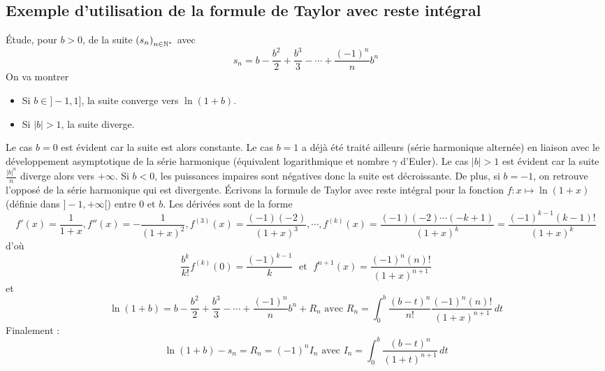 \subsection{Exemple d'utilisation de la formule de Taylor avec reste intégral}
\'Etude, pour $b>0$, de la suite $\left( s_n\right)_{n\in \mathbb{N}^*}$ avec
\begin{displaymath}
  s_n = b - \frac{b^2}{2} + \frac{b^3}{3}- \cdots + \frac{(-1)^n}{n}b^n
\end{displaymath}
On va montrer
\begin{itemize}
  \item Si $b\in ]-1,1]$, la suite converge vers $\ln(1+b)$.
  \item Si $|b|>1$, la suite diverge.
\end{itemize}
Le cas $b=0$ est évident car la suite est alors constante.
Le cas $b=1$ a déjà été traité ailleurs (série harmonique alternée) en liaison avec le développement asymptotique de la série harmonique (équivalent logarithmique et nombre $\gamma$ d'Euler).\newline
Le cas $|b|>1$ est évident car la suite $\frac{|b|^n}{n}$ diverge alors vers $+\infty$.\newline
Si $b<0$, les puissances impaires sont négatives donc la suite est décroissante. De plus, si $b=-1$, on retrouve l'opposé de la série harmonique qui est divergente.\newline
\'Ecrivons la formule de Taylor avec reste intégral pour la fonction $f : x\mapsto \ln(1+x)$ (définie dans $]-1,+\infty[$) entre $0$ et $b$.\newline
Les dérivées sont de la forme
\begin{displaymath}
f'(x) = \frac{1}{1+x}, f''(x) = -\frac{1}{(1+x)^2}, f^{(3)}(x) = \frac{(-1)(-2)}{(1+x)^3},\cdots,
f^{(k)}(x) = \frac{(-1)(-2)\cdots(-k+1)}{(1+x)^k}=\frac{(-1)^{k-1}(k-1)!}{(1+x)^k}
\end{displaymath}
d'où 
\begin{displaymath}
  \frac{b^k}{k!}f^{(k)}(0) = \frac{(-1)^{k-1}}{k} \;\text{ et }\;
  f^{n+1}(x) = \frac{(-1)^{n}(n)!}{(1+x)^{n+1}}
\end{displaymath}
et
\begin{displaymath}
\ln(1+b) = b - \frac{b^2}{2} + \frac{b^3}{3}- \cdots + \frac{(-1)^n}{n}b^n + R_n
\text{ avec }
R_n = \int_0^b\frac{(b-t)^n}{n!} \frac{(-1)^{n}(n)!}{(1+x)^{n+1}}\,dt
\end{displaymath}
Finalement :
\begin{displaymath}
  \ln(1+b) - s_n = R_n = (-1)^nI_n \text{ avec } I_n =\int_0^b\frac{(b-t)^n}{(1+t)^{n+1}}\, dt
\end{displaymath}
